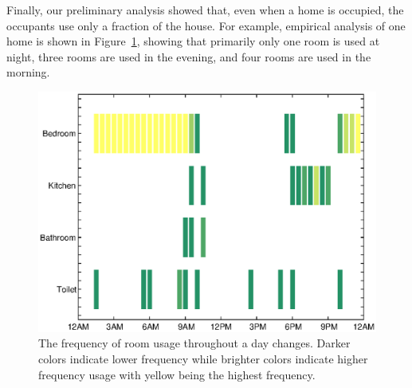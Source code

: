 Finally, our preliminary analysis showed that, even when a home is occupied, the
occupants use only a fraction of the house. For example, empirical analysis of
one home is shown in Figure~\ref{fig:roomUsage}, showing that primarily only one
room is used at night, three rooms are used in the evening, and four rooms are
used in the morning.

\begin{figure}[ht]
  \centering
  \includegraphics[width=1\columnwidth]{fig/roomUsage}
  \caption[Frequency of Room Usage Throughout a Day]{The frequency of room usage
    throughout a day changes. Darker colors indicate lower frequency while
    brighter colors indicate higher frequency usage with yellow being the
    highest frequency.}
  \label{fig:roomUsage}
\end{figure}
